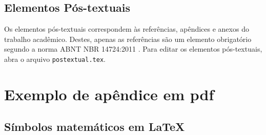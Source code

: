 \begin{apendicesenv}
\section*{Elementos Pós-textuais}

Os elementos pós-textuais correspondem às referências, apêndices e anexos do trabalho acadêmico. Destes, apenas as referências são um elemento obrigatório segundo a norma ABNT NBR 14724:2011 \cite{nbr14724}.  Para editar os elementos pós-textuais, abra o arquivo \verb|postextual.tex|.




\chapter{Exemplo de apêndice em pdf}\label{apend:exemplo}

\end{apendicesenv}

\begin{anexosenv}



\chapter{Símbolos matemáticos em LaTeX}\label{anexo:symbols}

\end{anexosenv}
